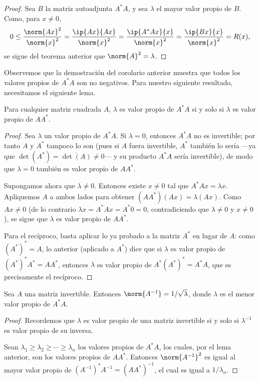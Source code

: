 \begin{proof}
    Sea $B$ la matriz autoadjunta $A^*A$, y sea $\lambda$ el mayor valor propio de $B$. Como, para $x\neq 0$,
    \begin{equation*}
        0\leq\frac{\norm{Ax}^2}{\norm{x}^2}=\frac{\ip{Ax}{Ax}}{\norm{x}^2}=\frac{\ip{A^*Ax}{x}}{\norm{x}^2}=\frac{\ip{Bx}{x}}{\norm{x}^2}=R(x),
    \end{equation*}
    se sigue del teorema anterior que $\norm{A}^2=\lambda$.
\end{proof}

Observemos que la demostración del corolario anterior muestra que todos los valores propios de $A^*A$ son no negativos. Para nuestro siguiente resultado, necesitamos el siguiente lema.

\begin{lema}
    Para cualquier matriz cuadrada $A$, $\lambda$ es valor propio de $A^*A$ si y solo si $\lambda$ es valor propio de $AA^*$.
\end{lema}

\begin{proof}
    Sea $\lambda$ un valor propio de $A^*A$. Si $\lambda=0$, entonces $A^*A$ no es invertible; por tanto $A$ y $A^*$ tampoco lo son (pues si $A$ fuera invertible, $A^*$ también lo sería —ya que $\det(A^*)=\overline{\det(A)}\neq 0$— y su producto $A^*A$ sería invertible), de modo que $\lambda=0$ también es valor propio de $AA^*$.

    Supongamos ahora que $\lambda\neq 0$. Entonces existe $x\neq 0$ tal que $A^*Ax=\lambda x$. Apliquemos $A$ a ambos lados para obtener $(AA^*)(Ax)=\lambda(Ax)$. Como $Ax\neq 0$ (de lo contrario $\lambda x=A^*Ax=A^*0=0$, contradiciendo que $\lambda\neq0$ y $x\neq0$), se sigue que $\lambda$ es valor propio de $AA^*$.

    Para el recíproco, basta aplicar lo ya probado a la matriz $A^*$ en lugar de $A$: como $(A^*)^*=A$, lo anterior (aplicado a $A^*$) dice que si $\lambda$ es valor propio de $(A^*)^*A^*=AA^*$, entonces $\lambda$ es valor propio de $A^*(A^*)^*=A^*A$, que es precisamente el recíproco.
\end{proof}

\begin{corolario}
    Sea $A$ una matriz invertible. Entonces $\norm{A^{-1}}=1/\sqrt\lambda$, donde $\lambda$ es el menor valor propio de $A^*A$.
\end{corolario}

\begin{proof}
    Recordemos que $\lambda$ es valor propio de una matriz invertible si y solo si $\lambda^{-1}$ es valor propio de su inversa.

    Sean $\lambda_1\geq\lambda_2\geq\cdots\geq\lambda_n$ los valores propios de $A^*A$, los cuales, por el lema anterior, son los valores propios de $AA^*$. Entonces $\norm{A^{-1}}^2$ es igual al mayor valor propio de $(A^{-1})^*A^{-1}=(AA^*)^{-1}$, el cual es igual a $1/\lambda_n$.
\end{proof}

